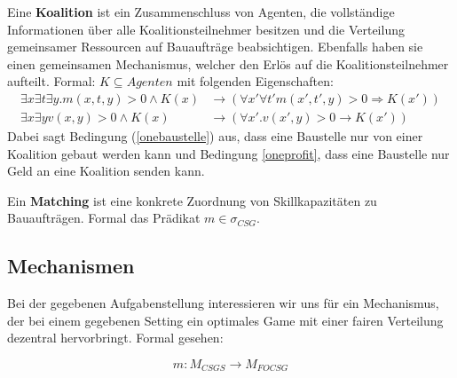 \begin{definition}[Koalition]
  Eine \textbf{Koalition} ist ein Zusammenschluss von Agenten, die vollständige Informationen über alle Koalitionsteilnehmer besitzen und die Verteilung gemeinsamer Ressourcen auf Bauaufträge beabsichtigen. Ebenfalls haben sie einen gemeinsamen Mechanismus, welcher den Erlös auf die Koalitionsteilnehmer aufteilt. Formal: $K\subseteq Agenten$ mit folgenden Eigenschaften:
  \begin{align}
    \exists x\exists t\exists y. m(x,t,y) > 0 \land K(x)&\rightarrow (\forall x'\forall t' m(x',t',y) > 0\Rightarrow K(x')) \label{onebaustelle} \\
    \exists x\exists y v(x,y) > 0 \land K(x) &\rightarrow (\forall x'.v(x', y) > 0 \rightarrow K(x')) \label{oneprofit}
  \end{align}
  Dabei sagt Bedingung (\ref{onebaustelle}) aus, dass eine Baustelle nur von einer Koalition gebaut werden kann und Bedingung \ref{oneprofit}, dass eine Baustelle nur Geld an eine Koalition senden kann.
\end{definition}

\begin{definition}[Matching]
  Ein \textbf{Matching} ist eine konkrete Zuordnung von Skillkapazitäten zu Bauaufträgen.
  Formal das Prädikat $m\in\sigma_{CSG}$.
\end{definition}



\subsection{Mechanismen}
Bei der gegebenen Aufgabenstellung interessieren wir uns für ein Mechanismus, der bei einem gegebenen Setting ein optimales Game mit einer fairen Verteilung dezentral hervorbringt. Formal gesehen:

\begin{equation}
  m: M_{CSGS} \rightarrow M_{FOCSG}
\end{equation}

